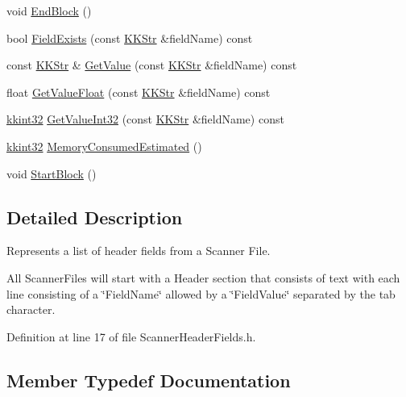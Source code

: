 \begin{DoxyCompactItemize}
\item 
void \hyperlink{class_k_k_l_s_c_1_1_scanner_header_fields_a5986aac2760aa2f4c203e3d1a218e7ce}{End\+Block} ()
\item 
bool \hyperlink{class_k_k_l_s_c_1_1_scanner_header_fields_a275d3c4c002a000f676424965d1d2264}{Field\+Exists} (const \hyperlink{class_k_k_b_1_1_k_k_str}{K\+K\+Str} \&field\+Name) const 
\item 
const \hyperlink{class_k_k_b_1_1_k_k_str}{K\+K\+Str} \& \hyperlink{class_k_k_l_s_c_1_1_scanner_header_fields_a1fb80c293954fa2d772704cbbc734170}{Get\+Value} (const \hyperlink{class_k_k_b_1_1_k_k_str}{K\+K\+Str} \&field\+Name) const 
\item 
float \hyperlink{class_k_k_l_s_c_1_1_scanner_header_fields_a307e0f65301507cfdc65eb6f8d00d186}{Get\+Value\+Float} (const \hyperlink{class_k_k_b_1_1_k_k_str}{K\+K\+Str} \&field\+Name) const 
\item 
\hyperlink{namespace_k_k_b_a8fa4952cc84fda1de4bec1fbdd8d5b1b}{kkint32} \hyperlink{class_k_k_l_s_c_1_1_scanner_header_fields_a85f7d196efec6bf50df9fb2c27ff8f5e}{Get\+Value\+Int32} (const \hyperlink{class_k_k_b_1_1_k_k_str}{K\+K\+Str} \&field\+Name) const 
\item 
\hyperlink{namespace_k_k_b_a8fa4952cc84fda1de4bec1fbdd8d5b1b}{kkint32} \hyperlink{class_k_k_l_s_c_1_1_scanner_header_fields_aa28120802eaa4d3783bea918813f6a87}{Memory\+Consumed\+Estimated} ()
\item 
void \hyperlink{class_k_k_l_s_c_1_1_scanner_header_fields_a09f0af2c12a1bb133bb5465633a7cf1a}{Start\+Block} ()
\end{DoxyCompactItemize}


\subsection{Detailed Description}
Represents a list of header fields from a Scanner File. 

All Scanner\+Files will start with a Header section that consists of text with each line consisting of a \char`\"{}\+Field\+Name\char`\"{} allowed by a \char`\"{}\+Field\+Value\char`\"{} separated by the tab character. 

Definition at line 17 of file Scanner\+Header\+Fields.\+h.



\subsection{Member Typedef Documentation}

